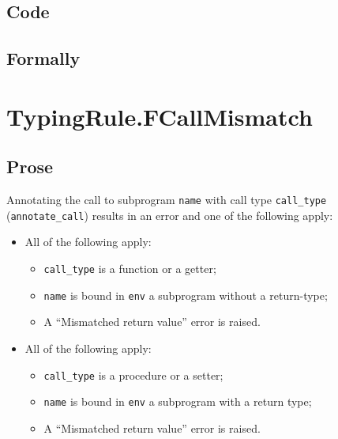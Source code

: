 \documentclass{book}
\begin{document}
  \subsection{Code}

\begin{emptyformal}
    \subsection{Formally}
\end{emptyformal}


\section{TypingRule.FCallMismatch \label{sec:TypingRule.FCallMismatch}}

  \subsection{Prose}
  Annotating the call to subprogram \texttt{name} with call type \texttt{call\_type} (\texttt{annotate\_call}) results in an error and
  one of the following apply:
  \begin{itemize}
    \item All of the following apply: \begin{itemize} \item \texttt{call\_type}
          is a function or a getter;
        \item \texttt{name} is bound in \texttt{env} a subprogram without a return-type;
        \item A ``Mismatched return value'' error is raised.
      \end{itemize}
    \item All of the following apply:
      \begin{itemize}
        \item \texttt{call\_type} is a procedure or a setter;
        \item \texttt{name} is bound in \texttt{env} a subprogram with a return type;
        \item A ``Mismatched return value'' error is raised.
      \end{itemize}
  \end{itemize}
\end{document}
